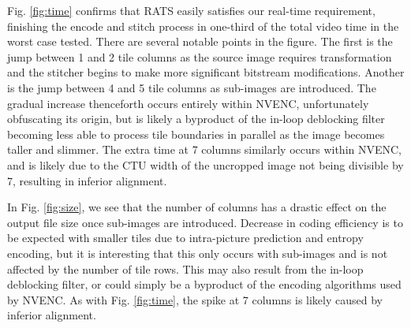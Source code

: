 Fig. \ref{fig:time} confirms that RATS easily satisfies our real-time requirement, finishing the encode and stitch process in one-third of the total video time in the worst case tested. There are several notable points in the figure. The first is the jump between 1 and 2 tile columns as the source image requires transformation and the stitcher begins to make more significant bitstream modifications. Another is the jump between 4 and 5 tile columns as sub-images are introduced. The gradual increase thenceforth occurs entirely within NVENC, unfortunately obfuscating its origin, but is likely a byproduct of the in-loop deblocking filter becoming less able to process tile boundaries in parallel as the image becomes taller and slimmer. The extra time at 7 columns similarly occurs within NVENC, and is likely due to the CTU width of the uncropped image not being divisible by 7, resulting in inferior alignment.

In Fig. \ref{fig:size}, we see that the number of columns has a drastic effect on the output file size once sub-images are introduced. Decrease in coding efficiency is to be expected with smaller tiles due to intra-picture prediction and entropy encoding, but it is interesting that this only occurs with sub-images and is not affected by the number of tile rows. This may also result from the in-loop deblocking filter, or could simply be a byproduct of the encoding algorithms used by NVENC. As with Fig. \ref{fig:time}, the spike at 7 columns is likely caused by inferior alignment.



